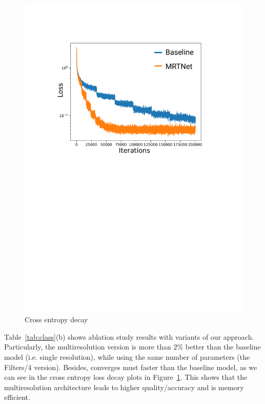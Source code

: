 \setlength{\intextsep}{0pt}%
\setlength{\columnsep}{0pt}%
\begin{figure} 
\includegraphics[width=1.0\linewidth]{imgs/convergence_loss.pdf}
\vspace{-20pt}
\caption{\small Cross entropy decay \label{fig:convergence}}
\end{figure} 
Table~\ref{tab:class}(b) shows ablation study results with variants of our approach.
Particularly, the multiresolution version is more than $2\%$ better than the baseline model (i.e. single resolution), 
while using the same number of parameters (the Filters/4 version). 
Besides, \mrtnet converges must faster than the baseline model, as we can see in the cross entropy loss decay plots in Figure~\ref{fig:convergence}. 
This shows that the multiresolution architecture leads to higher quality/accuracy and is memory efficient. 

